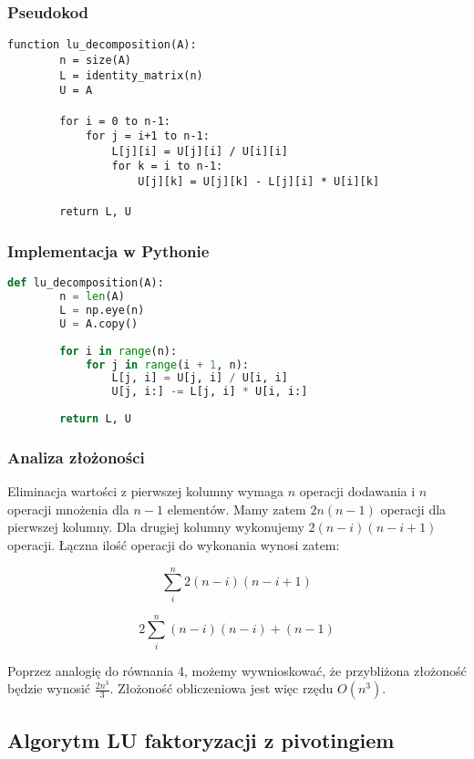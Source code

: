 \documentclass[12pt,a4paper,table]{article}
\begin{document}
    \subsubsection{Pseudokod}
    \begin{lstlisting}[]
    function lu_decomposition(A):
        n = size(A) 
        L = identity_matrix(n)
        U = A
    
        for i = 0 to n-1:
            for j = i+1 to n-1:
                L[j][i] = U[j][i] / U[i][i]
                for k = i to n-1:
                    U[j][k] = U[j][k] - L[j][i] * U[i][k]
    
        return L, U
    \end{lstlisting}

    \subsubsection{Implementacja w Pythonie}
    \begin{lstlisting}[language=Python]
    def lu_decomposition(A):
        n = len(A)
        L = np.eye(n)
        U = A.copy()
    
        for i in range(n):
            for j in range(i + 1, n):
                L[j, i] = U[j, i] / U[i, i]
                U[j, i:] -= L[j, i] * U[i, i:]
    
        return L, U
    \end{lstlisting}
    \subsubsection{Analiza złożoności}
    Eliminacja wartości z pierwszej kolumny wymaga $n$ operacji dodawania i $n$ operacji mnożenia dla $n-1$ elementów. Mamy zatem $2n(n-1)$ operacji dla pierwszej kolumny. Dla drugiej kolumny wykonujemy $2(n-i)(n-i+1)$ operacji. Łączna ilość operacji do wykonania wynosi zatem:

    \begin{equation}
        \sum_{i}^{n}2(n-i)(n-i+1)
    \end{equation}

    \begin{equation}
        2\sum_{i}^{n}(n-i)(n-i) + (n - 1)
    \end{equation}

    Poprzez analogię do równania 4, możemy wywnioskować, że przybliżona złożoność będzie wynosić $\frac{2n^3}{3}$. Złożoność obliczeniowa jest więc rzędu  \( O(n^3) \).

    
    \subsection{Algorytm LU faktoryzacji z pivotingiem}
\end{document}
